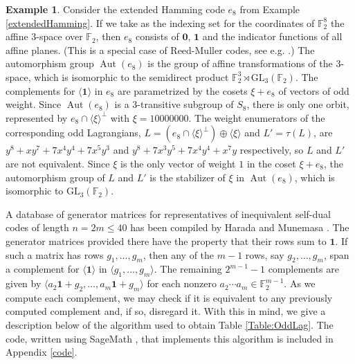 \documentclass[a4paper,reqno]{amsart}
\newcommand{\buno}{\mathbf{1}}
\newcommand{\bzero}{\mathbf{0}}
\newcommand{\FF}{\mathbb{F}}
\DeclareMathOperator{\Aut}{\mathrm{Aut}}%
\newcommand{\GL}{\mathrm{GL}}
\theoremstyle{definition}
\newtheorem{example}[theorem]{Example}
\theoremstyle{remark} \newtheorem{remark}[theorem]{Remark}
\numberwithin{equation}{section}
\begin{document}
\begin{example}\label{ex:odd_from_ext_Hamming}
Consider the extended Hamming code $e_8$ from Example \ref{extendedHamming}. 
If we take as the indexing set for the coordinates of $\FF_2^8$ the affine $3$-space over $\FF_2$, 
then $e_8$ consists of $\bzero$, $\buno$ and the indicator functions of all affine planes.
(This is a special case of Reed-Muller codes, see e.g. \cite[Ch.~9]{Adam}.)
The automorphism group $\Aut(e_8)$ is the group of affine transformations of the $3$-space, which is isomorphic to the semidirect product $\FF_2^3\rtimes\GL_3(\FF_2)$. The complements for $\langle\buno\rangle$ in $e_8$ are parametrized by the cosets $\xi+e_8$ of vectors of odd weight. Since $\Aut(e_8)$ is a $3$-transitive subgroup of $S_8$, there is only one 
orbit, represented by $e_8\cap\langle\xi\rangle^\perp$ with $\xi=10000000$. The weight enumerators of the corresponding odd Lagrangians, $L=(e_8\cap\langle\xi\rangle^\perp)\oplus\langle\xi\rangle$ and $L'=\tau(L)$, are $y^8+xy^7+7x^4y^4+7x^5y^3$ and $y^8+7x^3y^5+7x^4y^4+x^7y$ respectively, so $L$ and $L'$ are not equivalent. 
Since $\xi$ is the only vector of weight $1$ in the coset $\xi+e_8$, the automorphism group of $L$ and $L'$ is the stabilizer of $\xi$ in $\Aut(e_8)$, which is isomorphic to $\GL_3(\FF_2)$.
\end{example}

A database of generator matrices for representatives of inequivalent self-dual codes of length \(n = 2m \leq 40\) has been compiled by Harada and Munemasa \cite{database}. The generator matrices provided there have the property that their rows sum to \(\mathbf{1}\). If such a matrix has rows \(g_1,\dots, g_m\), then any of the \(m-1\) rows, say \(g_2,\dots, g_m\), span a complement for \(\langle \mathbf{1} \rangle\) in \(\langle g_1,\dots,g_m \rangle\). The remaining \(2^{m-1} - 1\) complements are given by \(\langle a_2 \mathbf{1} + g_2,\dots, a_m \mathbf{1} + g_m \rangle\) for each nonzero \(a_2\cdots a_m \in \mathbb{F}_2^{m-1}\). As we compute each complement, we may check if it is equivalent to any previously computed complement and, if so, disregard it. With this in mind, we give a description below of the algorithm used to obtain Table \ref{Table:OddLag}. The code, written using SageMath \cite{sage}, that implements this algorithm is included in Appendix \ref{code}.
\end{document}
